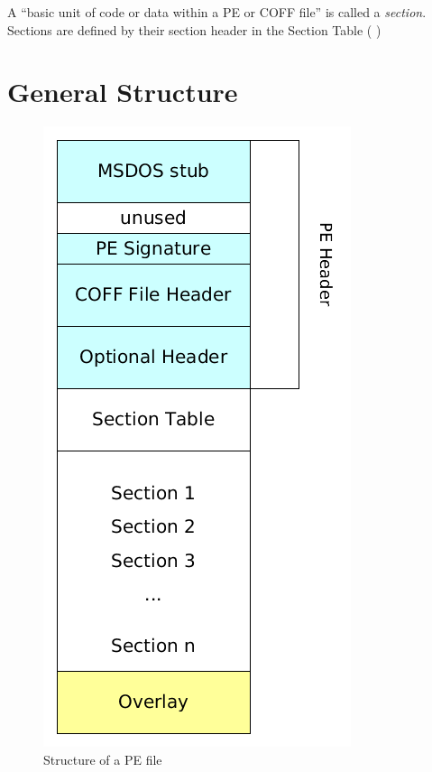 \begin{definition}[section]
A \enquote{basic unit of code or data within a PE or COFF file} \cite[]{pespec} is called a \emph{section}. Sections are defined by their section header in the Section Table (\cf{} \cite[26]{pespec})
\end{definition} 

\section{General Structure} \label{sec:pestructure}

\begin{figure}
\centering
\includegraphics[width=.98\textwidth, height=.60\textheight,keepaspectratio]{graphics/peformat}
\caption{Structure of a PE file}
\label{fig:peformat} 
\end{figure}

